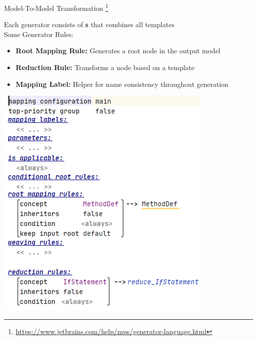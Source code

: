 	\begin{frame}{Model-To-Model Transformation \footnote[10]{\url{https://www.jetbrains.com/help/mps/generator-language.html}}}
		\begin{minipage}{0.52\textwidth}
			Each generator consists of \textbf{\workshopconfiguration s} that combines all templates\\
			
			Some Generator Rules:\\
			\begin{itemize}
				\item \textbf{Root Mapping Rule:} Generates a root node in the output model
				\item \textbf{Reduction Rule:} Transforms a node based on a template
				\item \textbf{Mapping Label:} Helper for name consistency throughout generation
			\end{itemize}
		\end{minipage}
		\begin{minipage}{0.4\textwidth}
			\includegraphics[height=0.85\textheight]{illustrations/mapping.png}
		\end{minipage}
	\end{frame}

